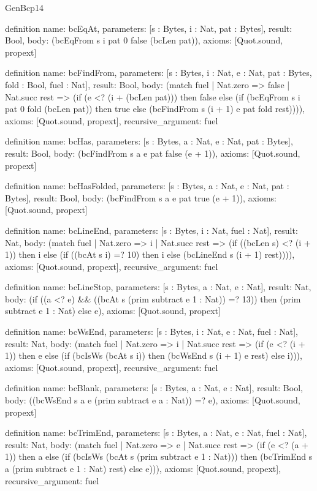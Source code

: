 \begin{lexlean}{GenBcp14}
\begin{semanticmodule}
definition{
  name: bcEqAt,
  parameters: [s : Bytes, i : Nat, pat : Bytes],
  result: Bool,
  body: (bcEqFrom s i pat 0 false (bcLen pat)),
  axioms: [Quot.sound, propext]
}

definition{
  name: bcFindFrom,
  parameters: [s : Bytes, i : Nat, e : Nat, pat : Bytes, fold : Bool, fuel : Nat],
  result: Bool,
  body: (match fuel
    | Nat.zero => false
    | Nat.succ rest => (if (e <? (i + (bcLen pat))) then false else (if (bcEqFrom s i pat 0 fold (bcLen pat)) then true else (bcFindFrom s (i + 1) e pat fold rest)))),
  axioms: [Quot.sound, propext],
  recursive_argument: fuel
}

definition{
  name: bcHas,
  parameters: [s : Bytes, a : Nat, e : Nat, pat : Bytes],
  result: Bool,
  body: (bcFindFrom s a e pat false (e + 1)),
  axioms: [Quot.sound, propext]
}

definition{
  name: bcHasFolded,
  parameters: [s : Bytes, a : Nat, e : Nat, pat : Bytes],
  result: Bool,
  body: (bcFindFrom s a e pat true (e + 1)),
  axioms: [Quot.sound, propext]
}

definition{
  name: bcLineEnd,
  parameters: [s : Bytes, i : Nat, fuel : Nat],
  result: Nat,
  body: (match fuel
    | Nat.zero => i
    | Nat.succ rest => (if ((bcLen s) <? (i + 1)) then i else (if ((bcAt s i) =? 10) then i else (bcLineEnd s (i + 1) rest)))),
  axioms: [Quot.sound, propext],
  recursive_argument: fuel
}

definition{
  name: bcLineStop,
  parameters: [s : Bytes, a : Nat, e : Nat],
  result: Nat,
  body: (if ((a <? e) && ((bcAt s (prim subtract e 1 : Nat)) =? 13)) then (prim subtract e 1 : Nat) else e),
  axioms: [Quot.sound, propext]
}

definition{
  name: bcWsEnd,
  parameters: [s : Bytes, i : Nat, e : Nat, fuel : Nat],
  result: Nat,
  body: (match fuel
    | Nat.zero => i
    | Nat.succ rest => (if (e <? (i + 1)) then e else (if (bcIsWs (bcAt s i)) then (bcWsEnd s (i + 1) e rest) else i))),
  axioms: [Quot.sound, propext],
  recursive_argument: fuel
}

definition{
  name: bcBlank,
  parameters: [s : Bytes, a : Nat, e : Nat],
  result: Bool,
  body: ((bcWsEnd s a e (prim subtract e a : Nat)) =? e),
  axioms: [Quot.sound, propext]
}

definition{
  name: bcTrimEnd,
  parameters: [s : Bytes, a : Nat, e : Nat, fuel : Nat],
  result: Nat,
  body: (match fuel
    | Nat.zero => e
    | Nat.succ rest => (if (e <? (a + 1)) then a else (if (bcIsWs (bcAt s (prim subtract e 1 : Nat))) then (bcTrimEnd s a (prim subtract e 1 : Nat) rest) else e))),
  axioms: [Quot.sound, propext],
  recursive_argument: fuel
}


\end{semanticmodule}
\end{lexlean}
